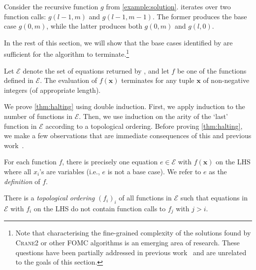 \documentclass[a4paper,UKenglish,cleveref,autoref,table]{lipics-v2021}
\newcommand{\Cranetwo}{\textsc{Crane2}}
\begin{document}
\begin{example}
  Consider the recursive function $g$ from \cref{example:solution}.
  \FindBaseCases iterates over two function calls: $g(l-1, m)$ and
  $g(l-1, m-1)$. The former produces the base case $g(0, m)$, while the latter
  produces both $g(0, m)$ and $g(l, 0)$.
\end{example}

In the rest of this section, we will show that the base cases identified by
\FindBaseCases are sufficient for the algorithm to terminate.\footnote{Note that
  characterising the fine-grained complexity of the solutions found by
  \Cranetwo{} or other FOMC algorithms is an emerging area of research. These
  questions have been partially addressed in previous
  work~\cite{DBLP:conf/kr/DilkasB23,DBLP:conf/kr/TothK24} and are unrelated to
  the goals of this section.}

\begin{theorem}\label{thm:halting}
  Let $\mathcal{E}$ denote the set of equations returned by
  \CompileWithBaseCases, and let $f$ be one of the functions defined in
  $\mathcal{E}$. The evaluation of $f(\mathbf{x})$ terminates for any tuple
  $\mathbf{x}$ of non-negative integers (of appropriate length).
\end{theorem}

We prove \cref{thm:halting} using double induction. First, we apply induction to
the number of functions in $\mathcal{E}$. Then, we use induction on the arity of
the `last' function in $\mathcal{E}$ according to a topological ordering. Before
proving \cref{thm:halting}, we make a few observations that are immediate
consequences of this and previous
work~\cite{DBLP:conf/kr/DilkasB23,DBLP:conf/ijcai/BroeckTMDR11}.

\begin{observation}\label{assumption1}
  For each function $f$, there is precisely one equation $e \in \mathcal{E}$
  with $f(\mathbf{x})$ on the LHS where all $x_{i}$'s are variables (i.e., $e$
  is not a base case). We refer to $e$ as the \emph{definition} of $f$.
\end{observation}

\begin{observation}\label{assumption2}
  There is a \emph{topological ordering} ${(f_{i})}_{i}$ of all functions in
  $\mathcal{E}$ such that equations in $\mathcal{E}$ with $f_{i}$ on the LHS do
  not contain function calls to $f_{j}$ with $j > i$.
\end{observation}
\end{document}
